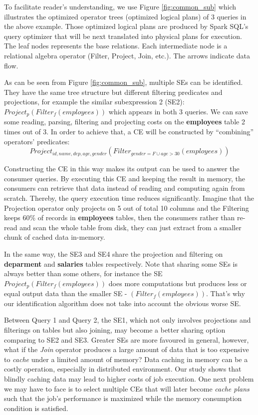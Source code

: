 To facilitate reader's understanding, we use Figure \ref{fig:common_sub} which illustrates the optimized operator trees (optimized logical plans) of 3 queries in the above example. Those optimized logical plans are produced by Spark SQL's query optimizer that will be next translated into physical plans for execution. The leaf nodes represents the base relations. Each intermediate node is a relational algebra operator (Filter, Project, Join, etc.). The arrows indicate data flow.

As can be seen from Figure \ref{fig:common_sub}, multiple SEs can be identified. They have the same tree structure but different filtering predicates and projections, for example the similar subexpression 2 (SE2): $Project_p(Filter_f(employees))$ which appears in both 3 queries. We can save some reading, parsing, filtering and projecting costs on the \textbf{employees} table 2 times out of 3. In order to achieve that, a CE will be constructed by ``combining'' operators' predicates: \[Project_{id, name, dep, age, gender}(Filter_{gender=F \cup age>30}(employees))\]

Constructing the CE in this way makes its output can be used to answer the consumer queries. By executing this CE and keeping the result in memory, the consumers can retrieve that data instead of reading and computing again from scratch. Thereby, the query execution time reduces significantly. Imagine that the Projection operator only projects on 5 out of total 10 columns and the Filtering keeps 60\% of records in \textbf{employees} tables, then the consumers rather than re-read and scan the whole table from disk, they can just extract from a smaller chunk of cached data in-memory. 

In the same way, the SE3 and SE4 share the projection and filtering on \textbf{deparment} and  \textbf{salaries} tables respectively. Note that sharing some SEs is always better than some others, for instance the SE $Project_p(Filter_f(employees))$ does more computations but produces less or equal output data than the smaller SE - $(Filter_f(employees))$. That's why our identification algorithm does not take into account the obvious worse SE.

Between Query 1 and Query 2, the SE1, which not only involves projections and filterings on tables but also joining, may become a better sharing option comparing to SE2 and SE3. Greater SEs are more favoured in general, however, what if the \emph{Join} operator produces a large amount of data that is too expensive to \emph{cache} under a limited amount of memory? Data caching in memory can be a costly operation, especially in distributed environment. Our study shows that blindly caching data may lead to higher costs of job execution. One next problem we may have to face is to select multiple CEs that will later become \emph{cache plans} such that the job's performance is maximized while the memory consumption condition is satisfied.

